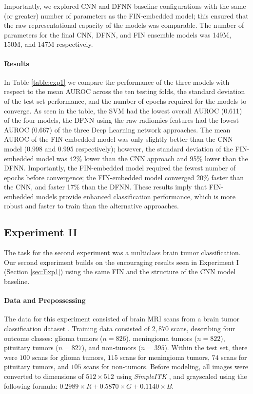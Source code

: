 \documentclass[conference]{IEEEtran}
\begin{document}
Importantly, we explored CNN and DFNN baseline configurations with the same (or greater) number of parameters as the FIN-embedded model; this ensured that the raw representational capacity of the models was comparable. The number of parameters for the final CNN, DFNN, and FIN ensemble models was 149M, 150M, and 147M respectively.

\paragraph*{Results}
In Table \ref{table:exp1} we compare the performance of the three models with respect to the mean AUROC across the ten testing folds, the standard deviation of the test set performance, and the number of epochs required for the models to converge. As seen in the table, the SVM had the lowest overall AUROC (0.611) of the four models, the DFNN using the raw radiomics features had the lowest AUROC (0.667) of the three Deep Learning network approaches. The mean AUROC of the FIN-embedded model was only slightly better than the CNN model (0.998 and 0.995 respectively); however, the standard deviation of the FIN-embedded model was 42\% lower than the CNN approach and 95\% lower than the DFNN. Importantly, the FIN-embedded model required the fewest number of epochs before convergence; the FIN-embedded model converged 20\% faster than the CNN, and faster 17\% than the DFNN. These results imply that FIN-embedded models provide enhanced classification performance, which is more robust and faster to train than the alternative approaches.


\subsection{Experiment II}\label{sec:Exp2}
The task for the second experiment was a multiclass brain tumor classification. Our second experiment builds on the encouraging results seen in Experiment I (Section \ref{sec:Exp1}) using the same FIN and the structure of the CNN model baseline.


\paragraph*{Data and Prepossessing} The data for this experiment consisted of brain MRI scans from a brain tumor classification dataset \cite{brainMulti}. Training data consisted of $2,870$ scans, describing four outcome classes: glioma tumors ($n=826$), meningioma tumors ($n=822$), pituitary tumors ($n=827$), and non-tumors ($n=395$). Within the test set, there were $100$ scans for glioma tumors, $115$ scans for meningioma tumors, $74$ scans for pituitary tumors, and $105$ scans for non-tumors. Before modeling, all images were converted to dimensions of $512 \times 512$ using \textit{SimpleITK} \cite{yaniv2018simpleitk}, and grayscaled using the following formula: \textit{$0.2989 \times R + 0.5870 \times G + 0.1140 \times B$}.
\end{document}
